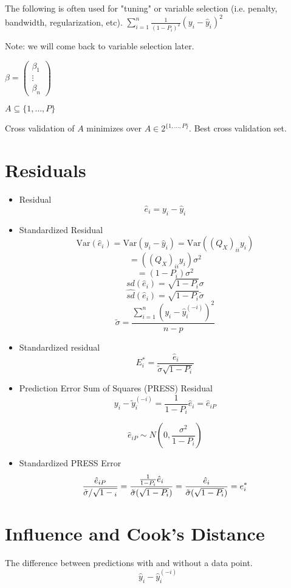\documentclass[11pt,fleqn]{book} %
\begin{document}
The following is often used for "tuning" or variable selection (i.e. penalty, bandwidth, regularization, etc).
$ \displaystyle \sum^n_{i=1} \frac{1}{(1 - P_i)^2}(y_i - \hat{y}_i)^2$

Note: we will come back to variable selection later. 

$\beta = \begin{pmatrix} \beta_1  \\  
\vdots \\
\beta_n
 \end{pmatrix}$

$ A \subseteq \{1, \dots, P \}$

Cross validation of $A$ minimizes over $A \in 2^{\{1, \dots, P \}}$. Best cross validation set. 




\section{Residuals}

\begin{itemize}
	\item Residual
		$$\hat{e}_i = y_i - \hat{y}_i $$
	\item Standardized Residual
		$$\text{Var}(\hat{e}_i) = \text{Var}(y_i - \hat{y}_i) = \text{Var}((Q_X)_{ii}y_i)$$
		$$= ((Q_X)_{ii}y_i) \sigma^2 $$
		$$= (1 - P_i)\sigma^2 $$
		$$ sd(\hat{e}_i) = \sqrt{1-P_i} \sigma $$
		$$\hat{sd}(\hat{e}_i) = \sqrt{1-P_i} \tilde{\sigma} $$
		$$ \tilde{\sigma} = \frac{\displaystyle \sum^n_{i=1} (y_i - \hat{y}_i^{(-i)})^2}{n-p}$$
	\item Standardized residual
		$$E^*_i = \frac{\hat{e}_i}{\tilde{\sigma} \sqrt{1 - P_i}} $$
	\item Prediction Error Sum of Squares (PRESS) Residual
		$$y_i - \tilde{y}_i^{(-i)} = \frac{1}{1-P_i} \hat{e}_i = \hat{e}_{iP} $$

		$$ \hat{e}_{iP} \sim N(0, \frac{\sigma^2}{1 - P_i})$$
	\item Standardized PRESS Error
		$$\frac{\hat{e}_{iP}}{\tilde{\sigma}/ \sqrt{1-{_i}}} = \frac{\frac{1}{1-P_i}\hat{e}_i}{\tilde{\sigma}\\(\sqrt{1 - P_i})} = \frac{\hat{e}_i}{\tilde{\sigma}\\(\sqrt{1 - P_i})} = e^*_i$$
\end{itemize}

\section{Influence and Cook's Distance}
\begin{definition}[Influence] The difference between predictions with and without a data point.
	$$\hat{y}_i - \hat{y}_i^{(-i)} $$

\end{definition}
\end{document}
